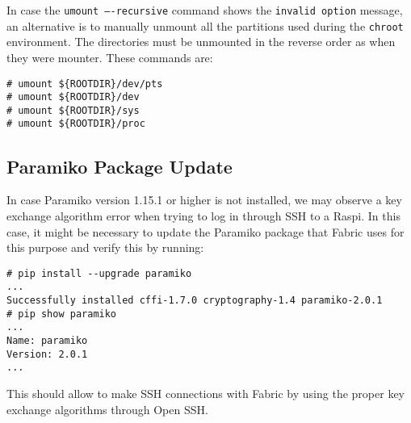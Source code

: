 
In case the \texttt{umount ----recursive} command shows the \texttt{invalid option}
message, an alternative is to manually unmount all the partitions used
during the \texttt{chroot} environment. The directories must be unmounted in
the reverse order as when they were mounter. These commands are:

\begin{lstlisting}[]
# umount ${ROOTDIR}/dev/pts
# umount ${ROOTDIR}/dev
# umount ${ROOTDIR}/sys
# umount ${ROOTDIR}/proc
\end{lstlisting}
\FloatBarrier
\vspace{-5mm}

\subsection{Paramiko Package Update}
\label{sec:paramiko}
In case Paramiko version 1.15.1 or higher is not installed, we may observe
a key exchange algorithm error when trying to log in through \ac{SSH} to a
Raspi. In this case, it might be necessary to update the Paramiko package
that Fabric uses for this purpose and verify this by running:

\begin{lstlisting}[]
# pip install --upgrade paramiko
...
Successfully installed cffi-1.7.0 cryptography-1.4 paramiko-2.0.1
# pip show paramiko
...
Name: paramiko
Version: 2.0.1
...
\end{lstlisting}
\FloatBarrier
\vspace{-5mm}

This should allow to make \ac{SSH} connections with Fabric by using the proper
key exchange algorithms through Open SSH.
